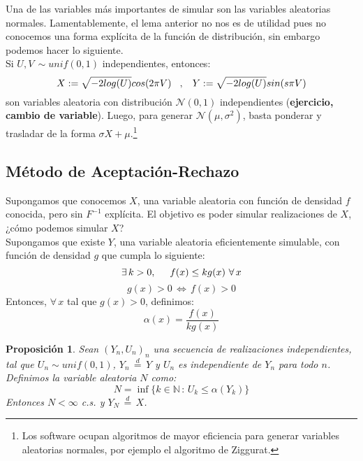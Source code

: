 \documentclass[a4paper]{article}
\newtheorem{prop}{Proposici\'on}
\numberwithin{equation}{subsection}
\def\N{\mathbb N}
\begin{document}
Una de las variables más importantes de simular son las variables aleatorias normales. Lamentablemente, el lema anterior no nos es de utilidad pues no conocemos una forma explícita de la función de distribución, sin embargo podemos hacer lo siguiente.\\ Si $U,V\,\sim unif(0,1)$ independientes, entonces:
\[X:= \sqrt{-2log(U)}cos(2\pi V)\hspace{0.3cm},\hspace{0.3cm}Y:=\sqrt{-2log(U)}sin(s\pi V)\]
son variables aleatoria con distribución $\mathcal{N}(0,1)$ independientes (\textbf{ejercicio, cambio de variable}). Luego, para generar $\mathcal{N}(\mu,\sigma^2)$, basta ponderar y trasladar de la forma $\sigma X + \mu$.\footnote{Los software ocupan algoritmos de mayor eficiencia para generar variables aleatorias normales, por ejemplo el algoritmo de Ziggurat.}

\subsection{Método de Aceptación-Rechazo}
Supongamos que conocemos $X$, una variable aleatoria con función de densidad $f$ conocida, pero sin $F^{-1}$ explícita. El objetivo es poder simular realizaciones de $X$, ¿cómo podemos simular $X$?\\ Supongamos que existe $Y$, una variable aleatoria eficientemente simulable, con función de densidad $g$ que cumpla lo siguiente:
\[\exists\,k>0,\hspace{0.5cm}f(x)\leq kg(x)\,\,\forall\,x\]
\[g(x)>0\,\Longleftrightarrow\,f(x)>0\]
Entonces, $\forall\,x$ tal que $g(x)>0$, definimos:
\begin{equation}
    \alpha(x) = \frac{f(x)}{kg(x)}
    \label{eq.alpha de x}
\end{equation}

\begin{prop} Sean $(Y_n,U_n)_n$ una secuencia de realizaciones independientes, tal que $U_n\sim unif(0,1)$, $Y_n\,\overset{d}{=}\,Y$ y $U_n$ es independiente de $Y_n$ para todo $n$. Definimos la variable aleatoria $N$ como:
\[N=\inf\{k\in\N\,:\,U_k \leq \alpha(Y_k)\}\]
Entonces $N<\infty$ c.s. y $Y_N \,\overset{d}{=}\,X$.
\end{prop}
\end{document}
